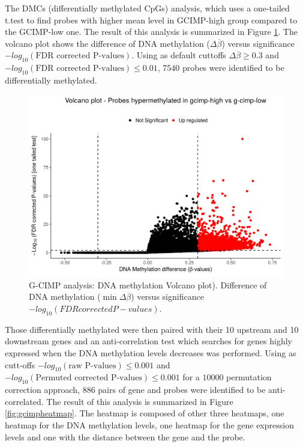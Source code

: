 The DMCs (differentially methylated CpGs) analysis, which uses a one-tailed t.test to find
probes with higher mean level in GCIMP-high group compared to the GCIMP-low one.
The result of this analysis is summarized in Figure \ref{fig:gcimpvolcano}.
The volcano plot shows the difference of DNA methylation ($\Delta\overline{\beta}$)
versus significance $-log_{10}(\textrm{FDR corrected P-values})$. Using as default cuttoffs
 $\Delta\overline{\beta}\geq0.3$ and $-log_{10}(\textrm{FDR corrected P-values})\leq 0.01$,
$7540$ probes were identified to be differentially methylated.

\begin{center}
\begin{figure}[h!]
\includegraphics[width=16cm]{images/gcimp_volcano.png}
\caption[G-CIMP analysis: Volcano plot]{\label{fig:gcimpvolcano}G-CIMP analysis: DNA methylation  Volcano plot). Difference of DNA methylation ($\min\Delta\overline{\beta}$) versus significance $-log_{10}(FDR corrected P-values)$.}
\end{figure}

\end{center}

Those differentially methylated were then paired with their 10 upstream and 10 downstream genes
and an anti-correlation test which searches for genes highly expressed when the DNA methylation levels
decreases was performed.
Using as cutt-offs
$-log_{10}(\textrm{raw P-values})\leq 0.001$ and $-log_{10}(\textrm{Permuted corrected P-values})\leq 0.001$
for a  $10000$ permutation correction approach,
886 pairs of gene and probes were identified to be anti-correlated.
The result of this analysis is summarized in Figure \ref{fig:gcimpheatmap}.
The heatmap is composed of other three heatmaps, one heatmap for the DNA methylation levels,
one heatmap for the gene expression levels and one with the distance between
the gene and the probe.

